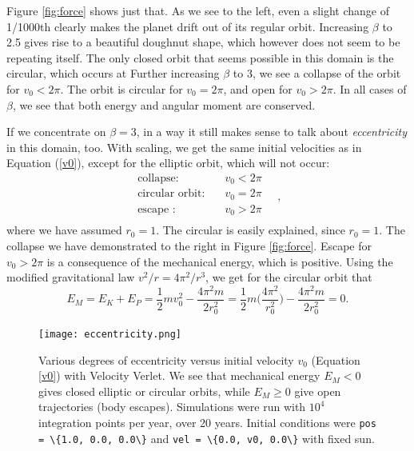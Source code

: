 \documentclass[]{article}
\begin{document}
Figure \ref{fig:force} shows just that. As we see to the left, even a slight change of 1/1000th clearly makes the planet drift out of its regular orbit. Increasing $\beta$ to 2.5 gives rise to a beautiful doughnut shape, which however does not seem to be repeating itself. The only closed orbit that seems possible in this domain is the circular, which occurs at Further increasing $\beta$ to 3, we see a collapse of the orbit for $v_0 < 2\pi$. The orbit is circular for $v_0 = 2\pi$, and open for $v_0 > 2\pi$. In all cases of $\beta$, we see that both energy and angular moment are conserved.

If we concentrate on $\beta = 3$, in a way it still makes sense to talk about \textit{eccentricity} in this domain, too. With scaling, we get the same initial velocities as in Equation (\ref{v0}), except for the elliptic orbit, which will not occur:
\begin{equation} \label{v0}
\begin{aligned}
	\text{collapse:}& \quad v_0 < 2 \pi \\
	\text{circular orbit:}& \quad v_0 = 2 \pi \\
	\text{escape :}& \quad v_0 > 2 \pi \\
\end{aligned} \quad,
\end{equation}
where we have assumed $r_0 = 1$. The circular is easily explained, since $r_0 = 1$. The collapse we have demonstrated to the right in Figure \ref{fig:force}. Escape for $v_0 > 2\pi$ is a consequence of the mechanical energy, which is positive. Using the modified gravitational law $v^2/r = 4\pi^2/r^3$, we get for the circular orbit that
\begin{equation}
	E_M = E_K + E_P = \frac{1}{2}mv_0^2 - \frac{4\pi^2 m}{2r_0^2} = \frac{1}{2}m \bigg(\frac{4\pi^2}{r_0^2} \bigg) - \frac{4\pi^2 m}{2r_0^2} = 0.
\end{equation}

\begin{figure}[!htb]
	\centering
	\texttt{[image: eccentricity.png]}
	\caption{Various degrees of eccentricity versus initial velocity $v_0$ (Equation \ref{v0}) with Velocity Verlet. We see that mechanical energy $E_M < 0$ gives closed elliptic or circular orbits, while $E_M \ge 0$ give open trajectories (body escapes). Simulations were run with $10^4$ integration points per year, over 20 years. Initial conditions were \lstinline|pos = \{1.0, 0.0, 0.0\}| and \lstinline|vel = \{0.0, v0, 0.0\}| with fixed sun.}
	\label{fig:eccentricity}
\end{figure}
\end{document}
